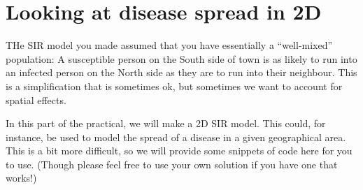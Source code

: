 \documentclass[pdflatex,a4paper]{article}
\begin{document}
\section{Looking at disease spread in 2D}

THe SIR model you made assumed that you have essentially a ``well-mixed'' population: A susceptible person on the South side of town is as likely to run into an infected person on the North side as they are to run into their neighbour. This is a simplification that is sometimes ok, but sometimes we want to account for spatial effects.

In this part of the practical, we will make a 2D SIR model. This could, for instance, be used to model the spread of a disease in a given geographical area. This is a bit more difficult, so we will provide some snippets of code here for you to use. (Though please feel free to use your own solution if you have one that works!)
\end{document}

